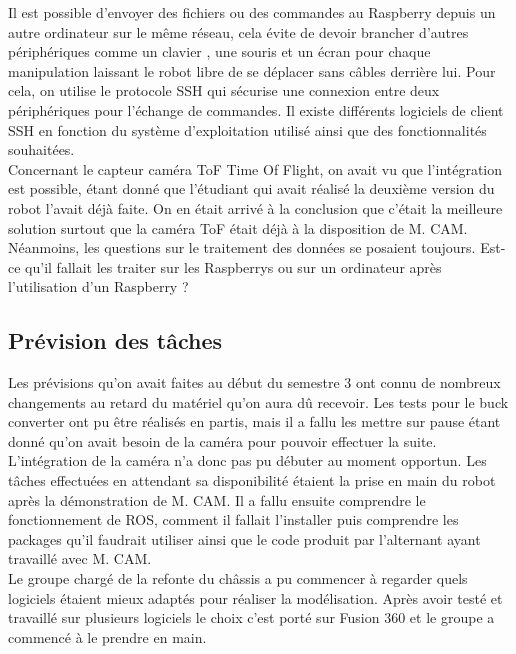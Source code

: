 Il est possible d’envoyer des fichiers ou des commandes au Raspberry depuis un autre ordinateur sur le même réseau, cela évite de devoir brancher d'autres périphériques comme un clavier , une souris et un écran pour chaque manipulation laissant le robot libre de se déplacer sans câbles derrière lui. Pour cela, on utilise le protocole SSH qui sécurise une connexion entre deux périphériques pour l’échange de commandes. Il existe différents logiciels de client SSH en fonction du système d’exploitation utilisé ainsi que des fonctionnalités souhaitées.\\

Concernant le capteur caméra ToF Time Of Flight, on avait vu que l’intégration est possible, étant donné que l’étudiant qui avait réalisé la deuxième version du robot l’avait déjà faite.
On en était arrivé à la conclusion que c'était la meilleure solution surtout que la caméra ToF était déjà à la disposition de M. CAM.
Néanmoins, les questions sur le traitement des données se posaient toujours. Est-ce qu'il fallait les traiter sur les Raspberrys ou sur un ordinateur après l’utilisation d’un Raspberry ?  

\subsection{Prévision des tâches}


Les prévisions qu’on avait faites au début du semestre 3 ont connu de nombreux changements au retard du matériel qu’on aura dû recevoir. 
Les tests pour le buck converter ont pu être réalisés en partis, mais il a fallu les mettre sur pause étant donné qu’on avait besoin de la caméra pour pouvoir effectuer la suite.\\
L’intégration de la caméra n’a donc pas pu débuter au moment opportun. Les tâches effectuées en attendant sa disponibilité étaient la prise en main du robot après la démonstration de M. CAM.
Il a fallu ensuite comprendre le fonctionnement de ROS, comment il fallait l’installer puis comprendre les packages qu’il faudrait utiliser ainsi que le code produit par l’alternant ayant travaillé avec M. CAM.\\
Le groupe chargé de la refonte du châssis a pu commencer à regarder quels logiciels étaient mieux adaptés pour réaliser la modélisation. Après avoir testé et travaillé sur plusieurs logiciels le choix c’est porté sur Fusion 360 et le groupe a commencé à le prendre en main.\\

